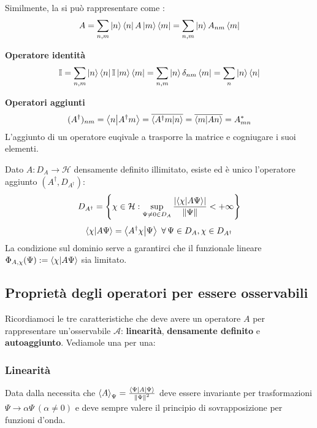 Similmente, la si può rappresentare come :
\begin{equation}
    A = \sum_{n,m} \ket{n} \bra{n}A \ket{m} \bra{m} = \sum_{n,m} \ket{n}  A_{nm} \bra{m}    
\end{equation}

\begin{example}
    \textbf{Operatore identità}
    \[
        \mathbb{I}= \sum_{n,m} \ket{n}\bra{n} \mathbb{I} \ket{m}\bra{m}= \sum_{n,m} \ket{n}\delta_{nm}\bra{m}= \sum_n \ket{n}\bra{n}
    \]
\end{example}

\begin{example}
    \textbf{Operatori aggiunti}
    \[
        (A^\dagger)_{nm}= \braket{n}{A^\dagger m}= \overline{\braket{A^\dagger m}{n}}= \overline{\braket{m}{A n}}= A_{mn}^*
    \]
    L'aggiunto di un operatore euqivale a trasporre la matrice e cogniugare i suoi elementi.
\end{example}

\begin{definition}
    Dato \(A: D_A \to \mathcal{H}\) densamente definito illimitato, 
    esiste ed è unico l'operatore aggiunto \((A^\dagger, D_{A^\dagger})\):
    \begin{equation*}
        D_{A^\dagger} = \left\{ \chi \in \mathcal{H} :\sup_{\Psi \neq 0  \in D_A} \frac{\abs{\braket{\chi}{A\Psi}}}{\norm{\Psi}}<+\infty\right\}
    \end{equation*} 
    \begin{equation}
        \braket{\chi}{A\Psi} = \braket{A^\dagger \chi}{\Psi} \ \forall\, \Psi \in D_A, \chi \in D_{A^\dagger}
    \end{equation}
    La condizione sul dominio serve a garantirci che il funzionale lineare \(\Phi_{A,\chi}(\Psi):= \braket{\chi}{A\Psi}\) sia limitato.
\end{definition}


\subsection{Proprietà degli operatori per essere osservabili}
Ricordiamoci le tre caratteristiche che deve avere un operatore \(A\) per rappresentare un'osservabile \(\mathcal{A}\): 
\textbf{linearità}, \textbf{densamente definito} e \textbf{autoaggiunto}. Vediamole una per una:

\subsubsection{Linearità}
Data dalla necessita che \(\expval{A}_{\Psi}= \frac{\expval{A}{\Psi}}{\norm{\Psi}^2}\) 
deve essere invariante per trasformazioni \(\Psi\to \alpha \Psi\ (\alpha\neq 0)\) e deve sempre valere il principio di sovrapposizione per funzioni d'onda.

